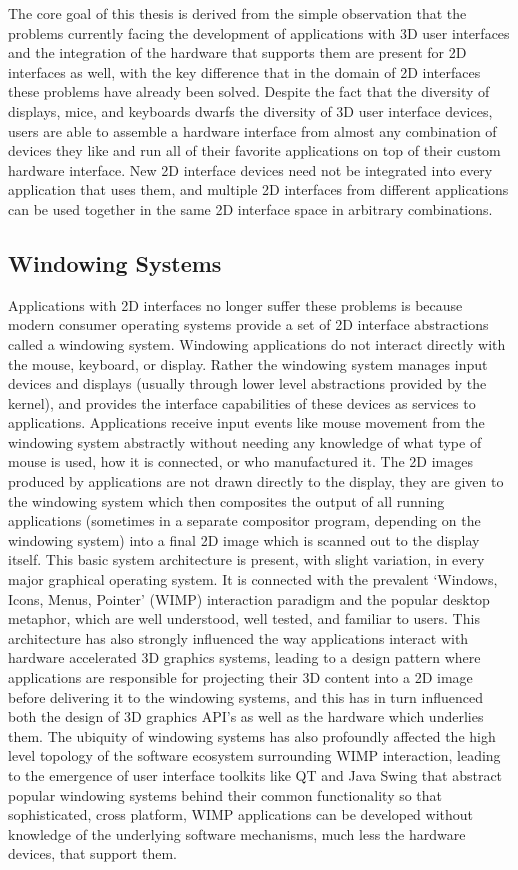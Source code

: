 	The core goal of this thesis is derived from the simple observation that the problems currently facing the development of applications with 3D user interfaces and the integration of the hardware that supports them are present for 2D interfaces as well, with the key difference that in the domain of 2D interfaces these problems have already been solved. Despite the fact that the diversity of displays, mice, and keyboards dwarfs the diversity of 3D user interface devices, users are able to assemble a hardware interface from almost any combination of devices they like and run all of their favorite applications on top of their custom hardware interface. New 2D interface devices need not be integrated into every application that uses them, and multiple 2D interfaces from different applications can be used together in the same 2D interface space in arbitrary combinations. 
	
\subsection{Windowing Systems}

	Applications with 2D interfaces no longer suffer these problems is because modern consumer operating systems provide a set of 2D interface abstractions called a windowing system. Windowing applications do not interact directly with the mouse, keyboard, or display. Rather the windowing system manages input devices and displays (usually through lower level abstractions provided by the kernel), and provides the interface capabilities of these devices as services to applications. Applications receive input events like mouse movement from the windowing system abstractly without needing any knowledge of what type of mouse is used, how it is connected, or who manufactured it. The 2D images produced by applications are not drawn directly to the display, they are given to the windowing system which then composites the output of all running applications (sometimes in a separate compositor program, depending on the windowing system) into a final 2D image which is scanned out to the display itself. 
This basic system architecture is present, with slight variation, in every major graphical operating system. It is connected with the prevalent ‘Windows, Icons, Menus, Pointer’ (WIMP) interaction paradigm and the popular desktop metaphor, which are well understood, well tested, and familiar to users. This architecture has also strongly influenced the way applications interact with hardware accelerated 3D graphics systems, leading to a design pattern where applications are responsible for projecting their 3D content into a 2D image before delivering it to the windowing systems, and this has in turn influenced both the design of 3D graphics API’s as well as the hardware which underlies them. The ubiquity of windowing systems has also profoundly affected the high level topology of the software ecosystem surrounding WIMP interaction, leading to the emergence of user interface toolkits like QT and Java Swing that abstract popular windowing systems behind their common functionality so that sophisticated, cross platform, WIMP applications can be developed without knowledge of the underlying software mechanisms, much less the hardware devices, that support them.
 

